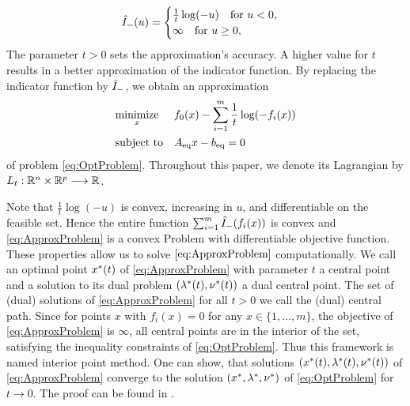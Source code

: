 \begin{equation}
	{\hat{I}}_{\mathrm{-}} (u) =
	\begin{cases}
	 \frac{1}{t}\log(-u) \quad \text{for } u < 0,\\
	 \infty \quad \text{for } u\geq 0,
	\end{cases}
\end{equation}
The parameter $ t>0 $ sets the approximation's accuracy. A higher value for $ t $ results in a better approximation of the indicator function.
By replacing the indicator function by $ {\hat{I}}_{\mathrm{-}} $, we obtain an
approximation 
\begin{equation}
\begin{aligned}
& \underset{x}{\text{minimize}}
& & f_0(x) - \sum_{i=1}^{m} \frac{1}{t} \log(-f_i(x)) \\
& \text{subject to}
& & {A}_{\mathrm{eq}} x - {b}_{\mathrm{eq}} = 0
\end{aligned} \label{eq:ApproxProblem}
\end{equation}
of problem \eqref{eq:OptProblem}. Throughout this paper, we denote its  Lagrangian by $ L_t: \mathbb{R}^n \times \mathbb{R}^p \longrightarrow \mathbb{R} $.

Note that $ \frac{1}{t}\log(-u) $ is convex, increasing in $ u $, and differentiable on the feasible set. Hence the entire function $ \sum_{i=1}^{m} {\hat{I}}_{\mathrm{-}}(f_i(x)) $ is convex and \eqref{eq:ApproxProblem} is a convex Problem with differentiable objective function. These properties allow us to solve $ \eqref{eq:ApproxProblem} $ computationally.
We call an optimal point $ x^*(t) $ of \eqref{eq:ApproxProblem} with parameter $ t $  a central point and a solution to its dual problem $ (\lambda^*(t),\nu^*(t)) $ a dual central point. The set of (dual) solutions of \eqref{eq:ApproxProblem} for all $ t>0 $ we call the (dual) central path. Since for points $ x $ with $ f_i(x) = 0 $ for any $ x \in \{1,\dots,m \} $, the objective of \eqref{eq:ApproxProblem} is $ \infty $, all central points are in the interior of the set, satisfying the inequality constraints of \eqref{eq:OptProblem}. Thus this framework is named interior point method. One can show, that solutions $ (x^*(t),\lambda^*(t),\nu^*(t)) $ of \eqref{eq:ApproxProblem} converge to the solution  $ (x^*,\lambda^*, \nu^*) $ of \eqref{eq:OptProblem} for $ t  \longrightarrow 0 $. The proof can be found in \cite{BV}.
\label{sec:BarrierConcept}
